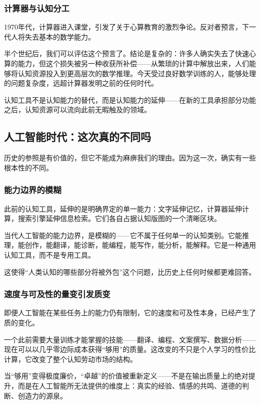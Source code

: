 \documentclass[11pt]{article}
\begin{document}
\subsubsection{计算器与认知分工}
\label{sec:org8ecb9d7}

1970年代，计算器进入课堂，引发了关于心算教育的激烈争论。反对者预言，下一代人将失去基本的数学能力。

半个世纪后，我们可以评估这个预言了。结论是复杂的：许多人确实失去了快速心算的能力，但这个损失被另一种收获所补偿——从繁琐的计算中解放出来，人们能够将认知资源投入到更高层次的数学推理。今天受过良好数学训练的人，能够处理的问题复杂度，远超计算器发明之前的任何时代。

认知工具不是认知能力的替代，而是认知能力的延伸——在新的工具承担部分功能之后，认知资源可以流向此前无暇触及的领域。
\subsection{人工智能时代：这次真的不同吗}
\label{sec:org187fd14}

历史的参照是有价值的，但它不能成为麻痹我们的理由。因为这一次，确实有一些根本性的不同。
\subsubsection{能力边界的模糊}
\label{sec:org6ee22e9}

此前的认知工具，延伸的是明确界定的单一能力：文字延伸记忆，计算器延伸计算，搜索引擎延伸信息检索。它们各自占据认知版图的一个清晰区块。

当代人工智能的能力边界，是模糊的——它不属于任何单一的认知类别。它能推理，能创作，能翻译，能诊断，能编程，能写作，能分析，能解释。它是一种通用认知工具，而不是专用工具。

这使得“人类认知的哪些部分将被外包”这个问题，比历史上任何时候都更难回答。
\subsubsection{速度与可及性的量变引发质变}
\label{sec:orgd3d4d80}

即便人工智能在某些任务上的能力仍有限制，它的速度和可及性本身，已经产生了质的变化。

一个此前需要大量训练才能掌握的技能——翻译、编程、文案撰写、数据分析——现在可以以几乎零边际成本获得“够用”的质量。这改变的不只是个人学习的性价比计算，它改变了整个认知劳动市场的结构。

当“够用”变得极度廉价，“卓越”的价值被重新定义——不是在输出质量上的绝对提升，而是在人工智能所无法提供的维度上：真实的经验、情感的共鸣、道德的判断、创造力的源泉。
\end{document}
